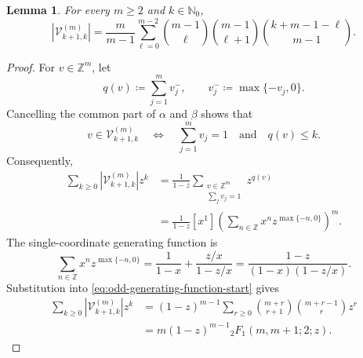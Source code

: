 \documentclass[aps,twocolumn,pra,superscriptaddress,nofootinbib]{revtex4-2}
\newtheorem{lem}{Lemma}
\begin{document}
\begin{lem}
    \label{lem:odd-cardinality}
    For every $m\geq2$ and $k\in\mathbb{N}_0$,
    \begin{equation}
        \left|\mathcal{V}_{k+1,k}^{(m)}\right|
        =
        \frac{m}{m-1}
        \sum_{\ell=0}^{m-2}
        \binom{m-1}{\ell}
        \binom{m-1}{\ell+1}
        \binom{k+m-1-\ell}{m-1}.
        \label{eq:odd-cardinality}
    \end{equation}
\end{lem}

\begin{proof}
    For $v\in\mathbb{Z}^m$, let
    \begin{equation}
        q(v)\coloneqq\sum_{j=1}^{m}v_j^-,
        \qquad
        v_j^-\coloneqq\max\{-v_j,0\}.
    \end{equation}
    Cancelling the common part of $\alpha$ and $\beta$ shows that
    \begin{equation}
        v\in\mathcal{V}_{k+1,k}^{(m)}
        \quad\Longleftrightarrow\quad
        \sum_{j=1}^{m}v_j=1
        \quad\text{and}\quad
        q(v)\leq k.
        \label{eq:odd-V-characterization}
    \end{equation}
    Consequently,
    \begin{align}
        \sum_{k\geq0}
        \left|\mathcal{V}_{k+1,k}^{(m)}\right|z^k
        &=
        \frac{1}{1-z}
        \sum_{\substack{v\in\mathbb{Z}^m\\\sum_jv_j=1}}
        z^{q(v)}
        \nonumber\\
        &=
        \frac{1}{1-z}
        [x^1]
        \left(
            \sum_{n\in\mathbb{Z}}
            x^n z^{\max\{-n,0\}}
        \right)^m.
        \label{eq:odd-generating-function-start}
    \end{align}
    The single-coordinate generating function is
    \begin{equation}
        \sum_{n\in\mathbb{Z}}
        x^n z^{\max\{-n,0\}}
        =
        \frac{1}{1-x}
        +
        \frac{z/x}{1-z/x}
        =
        \frac{1-z}{(1-x)(1-z/x)}.
    \end{equation}
    Substitution into \eqref{eq:odd-generating-function-start} gives
    \begin{align}
        \sum_{k\geq0}
        \left|\mathcal{V}_{k+1,k}^{(m)}\right|z^k
        &=
        (1-z)^{m-1}
        \sum_{r\geq0}
        \binom{m+r}{r+1}
        \binom{m+r-1}{r}z^r
        \nonumber\\
        &=
        m(1-z)^{m-1}
        {}_2F_1(m,m+1;2;z).

\end{align}
\end{proof}
\end{document}
